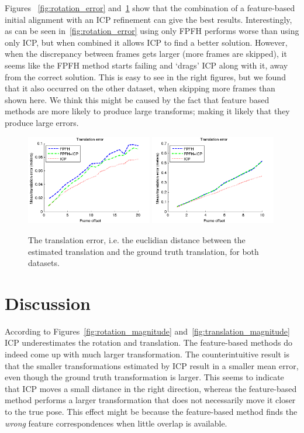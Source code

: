 \documentclass[a4paper]{article}
\begin{document}
Figures ~\ref{fig:rotation_error} and~\ref{fig:translation_error} show that the combination of a feature-based initial alignment with an \ac{ICP} refinement can give the best results. Interestingly, as can be seen in~\ref{fig:rotation_error} using only \ac{FPFH} performs worse than using only \ac{ICP}, but when combined it allows \ac{ICP} to find a better solution. However, when the discrepancy between frames gets larger (more frames are skipped), it seems like the \ac{FPFH} method starts failing and `drags' \ac{ICP} along with it, away from the correct solution. This is easy to see in the right figures, but we found that it also occurred on the other dataset, when skipping more frames than shown here. We think this might be caused by the fact that feature based methods are more likely to produce large transforms; making it likely that they produce large errors. 


\begin{figure}[H]
    \centering
        \includegraphics[width=0.49\textwidth]{ims/xyzTranslationerror.png}
        \includegraphics[width=0.49\textwidth]{ims/deskTranslationerror.png}
    \caption{The translation error, i.e. the euclidian distance between the estimated translation and the ground truth translation, for both datasets.}
    \label{fig:translation_error}
\end{figure}


\section{Discussion}

According to Figures~\ref{fig:rotation_magnitude} and~\ref{fig:translation_magnitude} \ac{ICP} underestimates the rotation and translation. The feature-based methods do indeed come up with much larger transformation. The counterintuitive result is that the smaller transformations estimated by \ac{ICP} result in a smaller mean error, even though the ground truth transformation is larger. This seems to indicate that \ac{ICP} moves a small distance in the right direction, whereas the feature-based method performs a larger transformation that does not necessarily move it closer to the true pose. This effect might be because the feature-based method finds the \emph{wrong} feature correspondences when little overlap is available.
\end{document}
